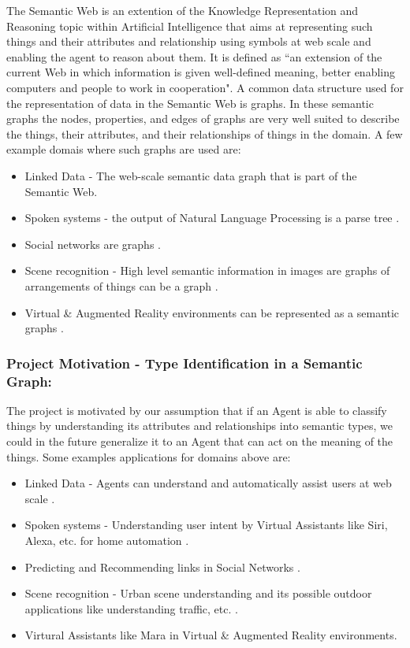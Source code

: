 \documentclass[runningheads,a4paper]{llncs}
\begin{document}
The Semantic Web is an extention of the Knowledge Representation and Reasoning topic within Artificial Intelligence that aims at representing such things and their attributes and relationship using symbols at web scale and enabling the agent to reason about them. 
It is defined as ``an extension of the current Web in which
information is given well-defined meaning, better enabling computers and people to
work in cooperation"\cite{berners2001semantic}. 
A common data structure used for the representation of data in the Semantic Web is graphs. 
In these semantic graphs the nodes, properties, and edges of graphs are very well suited to describe the things, their attributes,
and their relationships of things in the domain. A few example domais where such graphs are used are:
\begin{itemize}
\item Linked Data - The web-scale semantic data graph that is part of the Semantic Web\cite{heath2011linked}.
\item Spoken systems - the output of Natural Language Processing is a parse
tree \cite{socher2011parsing}.
\item Social networks are graphs \cite{backstrom2011supervised}.
\item Scene recognition - High level semantic information in images are graphs of arrangements of
things can be a graph \cite{socher2011parsing}.
\item Virtual \& Augmented Reality environments can be represented as a semantic graphs \cite{lugrin2007making}.
\end{itemize}

\subsubsection{Project Motivation -  Type Identification in a Semantic Graph:}
The project is motivated by 
our assumption that if an Agent is able to classify things by understanding
its attributes and relationships into semantic types, we could in the future 
generalize it to an Agent that can act on the meaning of the things. 
Some examples applications for domains above are:
\begin{itemize}
\item Linked Data - Agents can understand and automatically assist users at web scale \cite{berners2001semantic}.
\item Spoken systems - Understanding user intent by Virtual Assistants like Siri, Alexa, etc. for home automation \cite{tang2017emergence}. 
\item Predicting and Recommending links in Social Networks \cite{backstrom2011supervised}.
\item Scene recognition - Urban scene understanding and its possible outdoor applications like understanding traffic, etc. \cite{cordts2015cityscapes}.
\item Virtural Assistants like Mara \cite{schmeil2007mara} in Virtual \& Augmented Reality environments.
\end{itemize}
\end{document}
